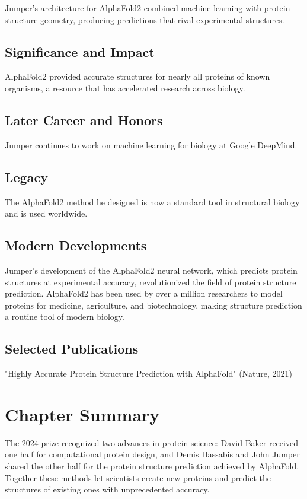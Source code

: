 Jumper's architecture for AlphaFold2 combined machine learning with protein structure geometry, producing predictions that rival experimental structures.

\subsection*{Significance and Impact}

AlphaFold2 provided accurate structures for nearly all proteins of known organisms, a resource that has accelerated research across biology.

\subsection*{Later Career and Honors}

Jumper continues to work on machine learning for biology at Google DeepMind.

\subsection*{Legacy}

The AlphaFold2 method he designed is now a standard tool in structural biology and is used worldwide.

\subsection*{Modern Developments}

Jumper's development of the AlphaFold2 neural network, which predicts protein structures at experimental accuracy, revolutionized the field of protein structure prediction. AlphaFold2 has been used by over a million researchers to model proteins for medicine, agriculture, and biotechnology, making structure prediction a routine tool of modern biology.

\subsection*{Selected Publications}

"Highly Accurate Protein Structure Prediction with AlphaFold" (Nature, 2021)

\clearpage

\section*{Chapter Summary}

The 2024 prize recognized two advances in protein science: David Baker received one half for computational protein design, and Demis Hassabis and John Jumper shared the other half for the protein structure prediction achieved by AlphaFold. Together these methods let scientists create new proteins and predict the structures of existing ones with unprecedented accuracy.
